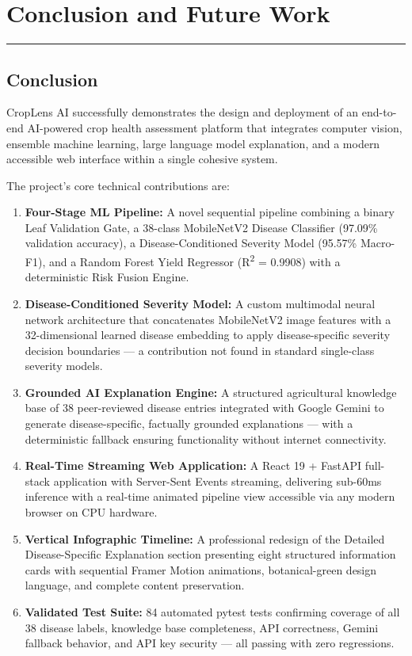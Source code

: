\chapter{Conclusion and Future Work}
\noindent\rule{\linewidth}{2pt}

\section{Conclusion}

CropLens AI successfully demonstrates the design and deployment of an end-to-end AI-powered crop health assessment platform that integrates computer vision, ensemble machine learning, large language model explanation, and a modern accessible web interface within a single cohesive system.

The project's core technical contributions are:

\begin{enumerate}
    \item \textbf{Four-Stage ML Pipeline:} A novel sequential pipeline combining a binary Leaf Validation Gate, a 38-class MobileNetV2 Disease Classifier (97.09\% validation accuracy), a Disease-Conditioned Severity Model (95.57\% Macro-F1), and a Random Forest Yield Regressor (R\textsuperscript{2} = 0.9908) with a deterministic Risk Fusion Engine.

    \item \textbf{Disease-Conditioned Severity Model:} A custom multimodal neural network architecture that concatenates MobileNetV2 image features with a 32-dimensional learned disease embedding to apply disease-specific severity decision boundaries — a contribution not found in standard single-class severity models.

    \item \textbf{Grounded AI Explanation Engine:} A structured agricultural knowledge base of 38 peer-reviewed disease entries integrated with Google Gemini to generate disease-specific, factually grounded explanations — with a deterministic fallback ensuring functionality without internet connectivity.

    \item \textbf{Real-Time Streaming Web Application:} A React 19 + FastAPI full-stack application with Server-Sent Events streaming, delivering sub-60ms inference with a real-time animated pipeline view accessible via any modern browser on CPU hardware.

    \item \textbf{Vertical Infographic Timeline:} A professional redesign of the Detailed Disease-\allowbreak Specific Explanation section presenting eight structured information cards with sequential Framer Motion animations, botanical-green design language, and complete content preservation.

    \item \textbf{Validated Test Suite:} 84 automated pytest tests confirming coverage of all 38 disease labels, knowledge base completeness, API correctness, Gemini fallback behavior, and API key security — all passing with zero regressions.
\end{enumerate}

